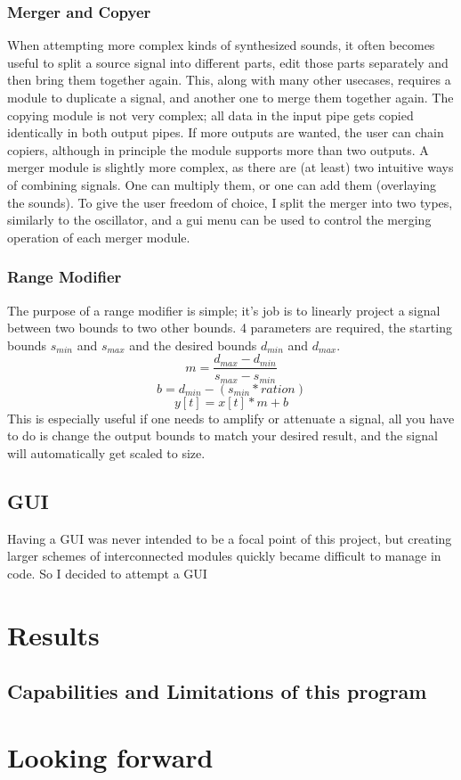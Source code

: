 \documentclass[11pt,a4paper]{article}
\begin{document}
\subsubsection{Merger and Copyer}

When attempting more complex kinds of synthesized sounds, it often becomes useful to split a source signal into different parts, edit those parts separately and then bring them together again. This, along with many other usecases, requires a module to duplicate a signal, and another one to merge them together again. The copying module is not very complex; all data in the input pipe gets copied identically in both output pipes. If more outputs are wanted, the user can chain copiers, although in principle the module supports more than two outputs.
A merger module is slightly more complex, as there are (at least) two intuitive ways of combining signals. One can multiply them, or one can add them (overlaying the sounds). To give the user freedom of choice, I split the merger into two types, similarly to the oscillator, and a gui menu can be used to control the merging operation of each merger module.

\subsubsection{Range Modifier}

The purpose of a range modifier is simple; it's job is to linearly project a signal between two bounds to two other bounds. 4 parameters are required, the starting bounds $s_{min}$ and $s_{max}$ and the desired bounds $d_{min}$ and $d_{max}$.
\begin{equation}
m = \frac{d_{max} - d_{min}}{s_{max} - s_{min}}
\end{equation}
\begin{equation}
b = d_{min} - (s_{min} * ration)
\end{equation}
\begin{equation}
y[t] = x[t]*m + b
\end{equation}
This is especially useful if one needs to amplify or attenuate a signal, all you have to do is change the output bounds to match your desired result, and the signal will automatically get scaled to size.

\subsection{GUI}

Having a GUI was never intended to be a focal point of this project, but creating larger schemes of interconnected modules quickly became difficult to manage in code. So I decided to attempt a GUI



\clearpage

\section{Results}

\subsection{Capabilities and Limitations of this program}

\section{Looking forward}


\end{document}
